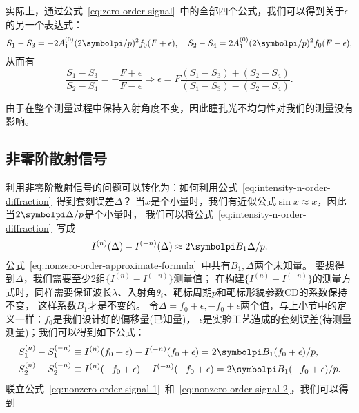 实际上，通过公式~\eqref{eq:zero-order-signal}~中的全部四个公式，我们可以得到关于$\epsilon$的另一个表达式：
\begin{equation*}
S_1-S_3 = - 2A_1^{(0)}(2\symbolpi/p)^2 f_0(F+\epsilon),\quad
S_2-S_4 = 2A_1^{(0)}(2\symbolpi/p)^2 f_0(F-\epsilon),
\end{equation*}
从而有
\begin{equation}\label{eq:epsilon-expression-from-4-formula-b}
\frac{S_1-S_3}{S_2-S_4} = - \frac{F+\epsilon}{F-\epsilon}
\Longrightarrow
\epsilon = F\frac{(S_1-S_3)+(S_2-S_4)}{(S_1-S_3)-(S_2-S_4)}.
\end{equation}

由于在整个测量过程中保持入射角度不变，因此瞳孔光不均匀性对我们的测量没有影响。

\subsection{非零阶散射信号~\label{非零阶散射信号}}
利用非零阶散射信号的问题可以转化为：如何利用公式~\eqref{eq:intensity-n-order-diffraction}~得到套刻误差$\Delta$？
当$x$是个小量时，我们有近似公式$\sin x\approx x$，因此当$2\symbolpi\Delta/p$是个小量时，
我们可以将公式~\eqref{eq:intensity-n-order-diffraction}~写成
\begin{equation}\label{eq:nonzero-order-approximate-formula}
I^{(n)}(\Delta)-I^{(-n)}(\Delta) \approx 2\symbolpi B_1 \Delta/p.
\end{equation}
公式~\eqref{eq:nonzero-order-approximate-formula}~中共有$B_1,\Delta$两个未知量。
要想得到$\Delta$，我们需要至少2组$\{I^{(n)}-I^{(-n)}\}$测量值；
在构建$\{I^{(n)}-I^{(-n)}\}$的测量方式时，同样需要保证波长$\lambda$、入射角$\theta_i$、靶标周期$p$和靶标形貌参数CD的系数保持不变，
这样系数$B_1$才是不变的。
令$\Delta=f_0+\epsilon,-f_0+\epsilon$两个值，与上小节中的定义一样：$f_0$是我们设计好的偏移量(已知量)，
$\epsilon$是实验工艺造成的套刻误差(待测量测量)；我们可以得到如下公式：
\begin{subequations}\label{eq:nonzero-order-signal}
\begin{align}
S_1^{(n)}-S_1^{(-n)} &\equiv I^{(n)}(f_0+\epsilon)-I^{(-n)}(f_0+\epsilon) = 2\symbolpi B_1 (f_0+\epsilon)/p, \label{eq:nonzero-order-signal-1} \\
S_2^{(n)}-S_2^{(-n)} &\equiv I^{(n)}(-f_0+\epsilon)-I^{(-n)}(-f_0+\epsilon) = 2\symbolpi B_1 (-f_0+\epsilon)/p. \label{eq:nonzero-order-signal-2}
\end{align}
\end{subequations}
联立公式~\eqref{eq:nonzero-order-signal-1}~和~\eqref{eq:nonzero-order-signal-2}，我们可以得到
